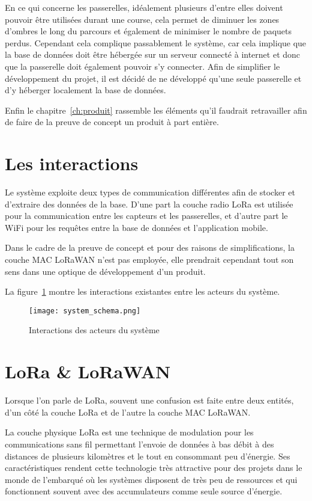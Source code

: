 En ce qui concerne les passerelles, idéalement plusieurs d'entre elles doivent pouvoir être utilisées durant une course, cela permet de diminuer les zones d'ombres le long du parcours et également de minimiser le nombre de paquets perdus. Cependant cela complique passablement le système, car cela implique que la base de données doit être hébergée sur un serveur connecté à internet et donc que la passerelle doit également pouvoir s'y connecter. Afin de simplifier le développement du projet, il est décidé de ne développé qu'une seule passerelle et d'y héberger localement la base de données.

Enfin le chapitre~\ref{ch:produit} rassemble les éléments qu'il faudrait retravailler afin de faire de la preuve de concept un produit à part entière.

\section{Les interactions}

Le système exploite deux types de communication différentes afin de stocker et d'extraire des données de la base. D'une part la couche radio LoRa est utilisée pour la communication entre les capteurs et les passerelles, et d'autre part le WiFi pour les requêtes entre la base de données et l'application mobile. 

Dans le cadre de la preuve de concept et pour des raisons de simplifications, la couche MAC LoRaWAN n'est pas employée, elle prendrait cependant tout son sens dans une optique de développement d'un produit.

La figure~\ref{fig:system_schema} montre les interactions existantes entre les acteurs du système.

\begin{figure}[htb]
\centering 
\texttt{[image: system\_schema.png]} 
\caption{Interactions des acteurs du système}
\label{fig:system_schema}
\end{figure}


\section{LoRa \& LoRaWAN}

Lorsque l'on parle de LoRa, souvent une confusion est faite entre deux entités, d'un côté la couche LoRa et de l'autre la couche MAC LoRaWAN.

La couche physique LoRa est une technique de modulation pour les communications sans fil permettant l'envoie de données à bas débit à des distances de plusieurs kilomètres et le tout en consommant peu d'énergie. Ses caractéristiques rendent cette technologie très attractive pour des projets dans le monde de l'embarqué où les systèmes disposent de très peu de ressources et qui fonctionnent souvent avec des accumulateurs comme seule source d'énergie.

